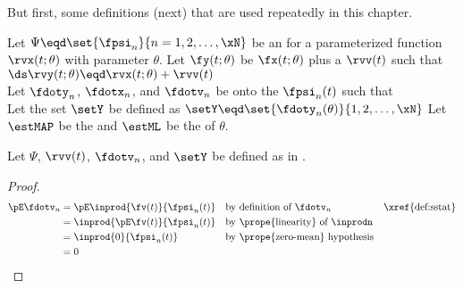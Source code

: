 But first, some definitions (next) that are used repeatedly in this chapter.
\begin{definition}
\label{def:sstat}
Let $\Psi\eqd\set{\fpsi_n}{n=1,2,\ldots,\xN}$ be an 
for a parameterized function $\rvx(t;\theta)$ with parameter $\theta$.
Let $\fy(t;\theta)$ be $\fx(t;\theta)$ plus a  $\rvv(t)$ such that
\\\indentx$\ds
  \rvy(t;\theta)\eqd\rvx(t;\theta)+\rvv(t)
$\\
Let $\fdoty_n$, $\fdotx_n$, and $\fdotv_n$ be 
onto the  $\fpsi_n(t)$ such that
\\
Let the set $\setY$ be defined as $\setY\eqd\set{\fdoty_n(\theta)}{1,2,\ldots,\xN}$
Let $\estMAP$ be the 
and $\estML$  be the   of $\theta$.
\end{definition}

\begin{lemma}
\label{lem:fdotv_pE}
Let $\Psi$, $\rvv(t)$, $\fdotv_n$, and $\setY$ be defined as in .
\end{lemma}
\begin{proof}
\begin{align*}
  \pE\fdotv_{n}
    &= \pE\inprod{\fv(t)}{\fpsi_n(t)}
    && \text{by definition of $\fdotv_n$}
    && \text{\xref{def:sstat}}
  \\&= \inprod{\pE\fv(t)}{\fpsi_n(t)}
    && \text{by \prope{linearity} of $\inprodn$}
  \\&= \inprod{0}{\fpsi_n(t)}
    && \text{by \prope{zero-mean} hypothesis}
  \\&= 0
\end{align*}
\end{proof}

